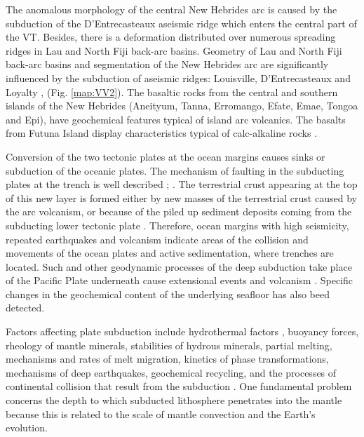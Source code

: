 \documentclass[11pt,a4paper]{report}
\begin{document}
The anomalous morphology of the central New Hebrides arc is caused by the subduction of the D’Entrecasteaux aseismic ridge which enters the central part of the \ac{VT}. Besides, there is a deformation distributed over numerous spreading ridges in Lau and North Fiji back-arc basins. Geometry of Lau and North Fiji back-arc basins and segmentation of the New Hebrides arc are significantly influenced by the subduction of aseismic ridges: Louisville, D'Entrecasteaux and Loyalty \citep{Pelletieretal1998}, \cite{Lemenkova202022} (Fig. \ref{map:VV2}). The basaltic rocks from the central and southern islands of the New Hebrides (Aneityum, Tanna, Erromango, Efate, Emae, Tongoa and Epi), have geochemical features typical of island arc volcanics. The basalts from Futuna Island display characteristics typical of calc-alkaline rocks \citep{Dupuy}.  

Conversion of the two tectonic plates at the ocean margins causes sinks or subduction of the oceanic plates. The mechanism of faulting in the subducting plates at the trench is well described \cite{Zhouetal2015}; \cite{Zhengetal2013}. The terrestrial crust appearing at the top of this new layer is formed either by new masses of the terrestrial crust caused by the arc volcanism, or because of the piled up sediment deposits coming from the subducting lower tectonic plate \cite{HueneScholl1991}. Therefore, ocean margins with high seismicity, repeated earthquakes and volcanism indicate areas of the collision and movements of the ocean plates and active sedimentation, where trenches are located. Such and other geodynamic processes of the deep subduction take place of the Pacific Plate underneath cause extensional events and volcanism \cite{Zhuetal2009}. Specific changes in the geochemical content of the underlying seafloor has also beed detected.

Factors affecting plate subduction include hydrothermal factors \cite{Yoshikawaetal2012}, buoyancy forces, rheology of mantle minerals, stabilities of hydrous minerals, partial melting, mechanisms and rates of melt migration, kinetics of phase transformations, mechanisms of deep earthquakes, geochemical recycling, and the processes of continental collision that result from the subduction \cite{Milleretal2005}. One fundamental problem concerns the depth to which subducted lithosphere penetrates into the mantle because this is related to the scale of mantle convection and the Earth’s evolution.
\end{document}
